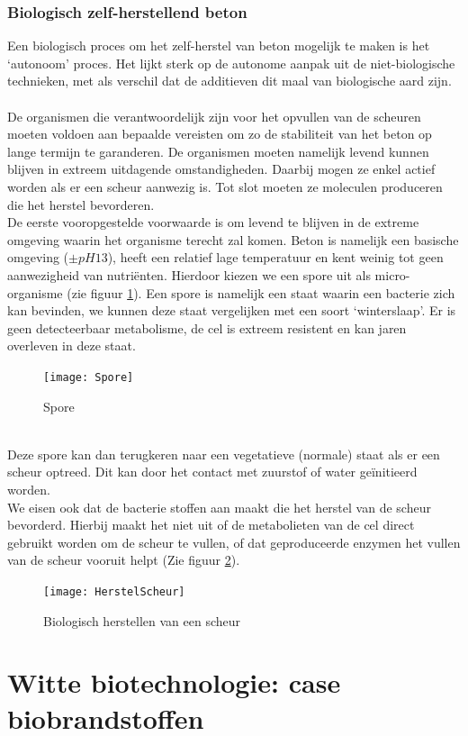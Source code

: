 \documentclass[a4paper,kul]{kulakarticle} %
\begin{document}
\subsubsection{Biologisch zelf-herstellend beton}
Een biologisch proces om het zelf-herstel van beton mogelijk te maken is het `autonoom' proces. Het lijkt sterk op de autonome aanpak uit de niet-biologische technieken, met als verschil dat de additieven dit maal van biologische aard zijn. \\
\\
De organismen die verantwoordelijk zijn voor het opvullen van de scheuren moeten voldoen aan bepaalde vereisten om zo de stabiliteit van het beton op lange termijn te garanderen. De organismen moeten namelijk levend kunnen blijven in extreem uitdagende omstandigheden. Daarbij mogen ze enkel actief worden als er een scheur aanwezig is. Tot slot moeten ze moleculen produceren die het herstel bevorderen.\\
\newpage
\noindent
De eerste vooropgestelde voorwaarde is om levend te blijven in de extreme omgeving waarin het organisme terecht zal komen. Beton is namelijk een basische omgeving ($\pm pH 13$), heeft een relatief lage temperatuur en kent weinig tot geen aanwezigheid van nutriënten. Hierdoor kiezen we een spore uit als micro-organisme (zie figuur \ref{fig:spore}). Een spore is namelijk een staat waarin een bacterie zich kan bevinden, we kunnen deze staat vergelijken met een soort `winterslaap'. Er is geen detecteerbaar metabolisme, de cel is extreem resistent en kan jaren overleven in deze staat. 
\begin{figure}[h]
	\centering
	\texttt{[image: Spore]}
	\caption[Spore]{Spore}
	\label{fig:spore}
\end{figure}\\
Deze spore kan dan terugkeren naar een vegetatieve (normale) staat als er een scheur optreed. Dit kan door het contact met zuurstof of water geïnitieerd  worden.
\\
We eisen ook dat de bacterie stoffen aan maakt die het herstel van de scheur bevorderd. Hierbij maakt het niet uit of de metabolieten van de cel direct gebruikt worden om de scheur te vullen, of dat geproduceerde enzymen het vullen van de scheur vooruit helpt (Zie figuur \ref{fig:herstelscheur}).
\begin{figure}[h]
	\centering
	\texttt{[image: HerstelScheur]}
	\caption[Biologisch herstellen scheur]{Biologisch herstellen van een scheur}
	\label{fig:herstelscheur}
\end{figure}
\newpage
\section{Witte biotechnologie: case biobrandstoffen}
\label{sec:biobrandstoffen}
\end{document}
